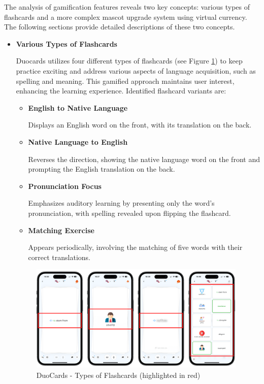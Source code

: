 The analysis of gamification features reveals two key concepts: various types of flashcards and a more complex mascot upgrade system using virtual currency. The following sections provide detailed descriptions of these two concepts.

\begin{itemize}
    \item \textbf{Various Types of Flashcards}

    Duocards utilizes four different types of flashcards (see Figure \ref{fig:duocards-flashcard-types}) to keep practice exciting and address various aspects of language acquisition, such as spelling and meaning. This gamified approach maintains user interest, enhancing the learning experience. Identified flashcard variants are:

    \begin{itemize} 
         \item \textbf{English to Native Language}
         
         Displays an English word on the front, with its translation on the back. 

         \item \textbf{Native Language to English}
         
         Reverses the direction, showing the native language word on the front and prompting the English translation on the back.
         
        \item \textbf{Pronunciation Focus}
        
        Emphasizes auditory learning by presenting only the word’s pronunciation, with spelling revealed upon flipping the flashcard. 
        
        \item \textbf{Matching Exercise}
        
        Appears periodically, involving the matching of five words with their correct translations. 
    
    \end{itemize}

    \begin{figure}[!h]
        \includegraphics[width=0.98\textwidth]{src/figures/duocards-flashcard-types.png}
        \caption{DuoCards - Types of Flashcards (highlighted in red)}
        \label{fig:duocards-flashcard-types}
    \end{figure}
    

\end{itemize}
